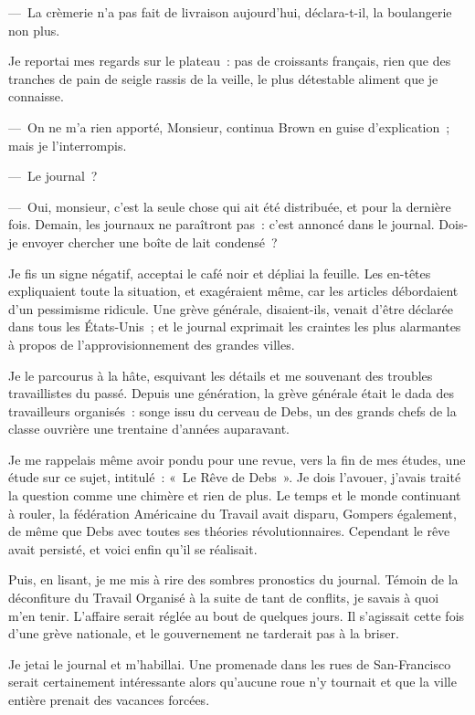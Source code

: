 \documentclass[french,twoside]{book} %
\begin{document}
— La crèmerie n’a pas fait de livraison aujourd’hui, déclara-t-il, la boulangerie non plus.\par
Je reportai mes regards sur le plateau : pas de croissants français, rien que des tranches de pain de seigle rassis de la veille, le plus détestable aliment que je connaisse.\par
— On ne m’a rien apporté, Monsieur, continua Brown en guise d’explication ; mais je l’interrompis.\par
— Le journal ?\par
— Oui, monsieur, c’est la seule chose qui ait été distribuée, et pour la dernière fois. Demain, les journaux ne paraîtront pas : c’est annoncé dans le journal. Dois-je envoyer chercher une boîte de lait condensé ?\par
Je fis un signe négatif, acceptai le café noir et dépliai la feuille. Les en-têtes expliquaient toute la situation, et exagéraient même, car les articles débordaient d’un pessimisme ridicule. Une grève générale, disaient-ils, venait d’être déclarée dans tous les États-Unis ; et le journal exprimait les craintes les plus alarmantes à propos de l’approvisionnement des grandes villes.\par
Je le parcourus à la hâte, esquivant les détails et me souvenant des troubles travaillistes du passé. Depuis une génération, la grève générale était le dada des travailleurs organisés : songe issu du cerveau de Debs, un des grands chefs de la classe ouvrière une trentaine d’années auparavant.\par
Je me rappelais même avoir pondu pour une revue, vers la fin de mes études, une étude sur ce sujet, intitulé : « Le Rêve de Debs ». Je dois l’avouer, j’avais traité la question comme une chimère et rien de plus. Le temps et le monde continuant à rouler, la fédération Américaine du Travail avait disparu, Gompers également, de même que Debs avec toutes ses théories révolutionnaires. Cependant le rêve avait persisté, et voici enfin qu’il se réalisait.\par
Puis, en lisant, je me mis à rire des sombres pronostics du journal. Témoin de la déconfiture du Travail Organisé à la suite de tant de conflits, je savais à quoi m’en tenir. L’affaire serait réglée au bout de quelques jours. Il s’agissait cette fois d’une grève nationale, et le gouvernement ne tarderait pas à la briser.\par
Je jetai le journal et m’habillai. Une promenade dans les rues de San-Francisco serait certainement intéressante alors qu’aucune roue n’y tournait et que la ville entière prenait des vacances forcées.\par
\end{document}
